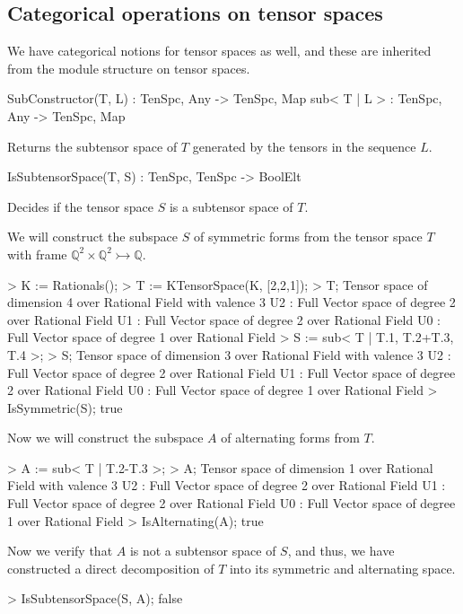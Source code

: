 \subsection{Categorical operations on tensor spaces}

We have categorical notions for tensor spaces as well, and these are inherited
from the module structure on tensor spaces.

\begin{intrinsics}
SubConstructor(T, L) : TenSpc, Any -> TenSpc, Map
sub< T | L > : TenSpc, Any -> TenSpc, Map
\end{intrinsics}

Returns the subtensor space of $T$ generated by the tensors in the sequence $L$.

\begin{intrinsics}
IsSubtensorSpace(T, S) : TenSpc, TenSpc -> BoolElt
\end{intrinsics}

Decides if the tensor space $S$ is a subtensor space of $T$.

\begin{example}[SubtensorSpaces]

We will construct the subspace $S$ of symmetric forms from the tensor space $T$
with frame $\mathbb{Q}^2\times\mathbb{Q}^2\rightarrowtail \mathbb{Q}$.
\begin{code}
> K := Rationals();
> T := KTensorSpace(K, [2,2,1]);
> T;
Tensor space of dimension 4 over Rational Field with valence 3
U2 : Full Vector space of degree 2 over Rational Field
U1 : Full Vector space of degree 2 over Rational Field
U0 : Full Vector space of degree 1 over Rational Field
> S := sub< T | T.1, T.2+T.3, T.4 >;
> S;
Tensor space of dimension 3 over Rational Field with valence 3
U2 : Full Vector space of degree 2 over Rational Field
U1 : Full Vector space of degree 2 over Rational Field
U0 : Full Vector space of degree 1 over Rational Field
> IsSymmetric(S);
true
\end{code}

Now we will construct the subspace $A$ of alternating forms from $T$.
\begin{code}
> A := sub< T | T.2-T.3 >;
> A;
Tensor space of dimension 1 over Rational Field with valence 3
U2 : Full Vector space of degree 2 over Rational Field
U1 : Full Vector space of degree 2 over Rational Field
U0 : Full Vector space of degree 1 over Rational Field
> IsAlternating(A);
true
\end{code}

Now we verify that $A$ is not a subtensor space of $S$, and thus, we have
constructed a direct decomposition of $T$ into its symmetric and alternating
space.
\begin{code}
> IsSubtensorSpace(S, A);
false
\end{code}
\end{example}

